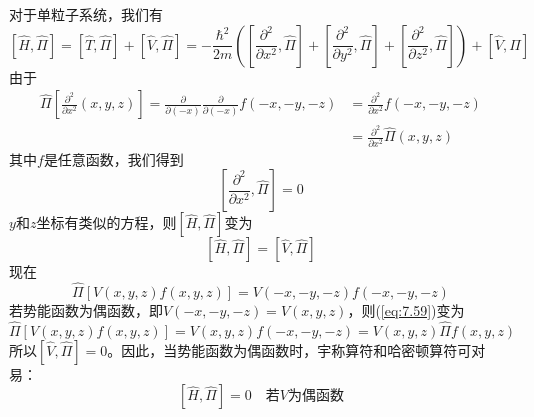     对于单粒子系统，我们有
    \begin{equation*}
        \left[\hat{H},\hat{\Pi}\right] = \left[\hat{T},\hat{\Pi}\right] + \left[\hat{V},\hat{\Pi}\right] = -\frac{\hbar^2}{2m}\left(\left[\frac{\partial^2}{\partial x^2},\hat{\Pi}\right] + \left[\frac{\partial^2}{\partial y^2},\hat{\Pi}\right] + \left[\frac{\partial^2}{\partial z^2},\hat{\Pi}\right]\right) + \left[\hat{V},\hat{\Pi}\right]
    \end{equation*}
    由于
    \begin{equation*}
        \begin{aligned}
            \hat{\Pi}\left[\frac{\partial^2}{\partial x^2}\left(x,y,z\right)\right] = \frac{\partial}{\partial\left(-x\right)}\frac{\partial}{\partial\left(-x\right)}f\left(-x,-y,-z\right) &= \frac{\partial^2}{\partial x^2}f\left(-x,-y,-z\right) \\
            &= \frac{\partial^2}{\partial x^2}\hat{\Pi}\left(x,y,z\right)
        \end{aligned}
    \end{equation*}
    其中$f$是任意函数，我们得到
    \begin{equation*}
        \left[\frac{\partial^2}{\partial x^2}, \hat{\Pi}\right] = 0
    \end{equation*}
    $y$和$z$坐标有类似的方程，则$\left[\hat{H},\hat{\Pi}\right]$变为
    \begin{equation}
        \left[\hat{H},\hat{\Pi}\right] = \left[\hat{V},\hat{\Pi}\right]
        \label{eq:7.58}
    \end{equation}
    现在
    \begin{equation}
        \hat{\Pi}\left[V\left(x,y,z\right)f\left(x,y,z\right)\right] = V\left(-x,-y,-z\right)f\left(-x,-y,-z\right)
        \label{eq:7.59}
    \end{equation}
    若势能函数为偶函数，即$V\left(-x,-y,-z\right) = V\left(x,y,z\right)$，则(\ref{eq:7.59})变为
    \begin{equation*}
        \hat{\Pi}\left[V\left(x,y,z\right)f\left(x,y,z\right)\right] = V\left(x,y,z\right)f\left(-x,-y,-z\right) = V\left(x,y,z\right)\hat{\Pi}f\left(x,y,z\right)
    \end{equation*}
    所以$\left[\hat{V},\hat{\Pi}\right] = 0$。因此，当势能函数为偶函数时，宇称算符和哈密顿算符可对易：
    \begin{equation}
        \left[\hat{H},\hat{\Pi}\right] = 0 \quad \text{若} V \text{为偶函数}
        \label{eq:7.60}
    \end{equation}

